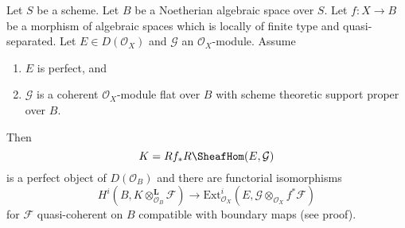 \begin{lemma}
\label{lemma-compute-ext-perfect}
Let $S$ be a scheme. Let $B$ be a Noetherian algebraic space over $S$.
Let $f : X \to B$ be a morphism of algebraic spaces which is locally of
finite type and quasi-separated. Let $E \in D(\mathcal{O}_X)$
and $\mathcal{G}$ an $\mathcal{O}_X$-module. Assume
\begin{enumerate}
\item $E$ is perfect, and
\item $\mathcal{G}$ is a coherent $\mathcal{O}_X$-module flat over $B$
with scheme theoretic support proper over $B$.
\end{enumerate}
Then
$$
K = Rf_*R\SheafHom(E, \mathcal{G})
$$
is a perfect object of $D(\mathcal{O}_B)$ and there are functorial isomorphisms
$$
H^i(B, K \otimes^\mathbf{L}_{\mathcal{O}_B} \mathcal{F})
\longrightarrow
\text{Ext}^i_{\mathcal{O}_X}(E,
\mathcal{G} \otimes_{\mathcal{O}_X} f^*\mathcal{F})
$$
for $\mathcal{F}$ quasi-coherent on $B$
compatible with boundary maps (see proof).
\end{lemma}

